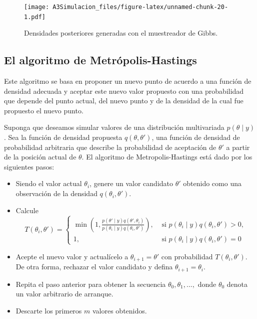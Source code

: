 \documentclass[
  10pt,
  spanish,
]{book}
\providecommand{\tightlist}{%
  \setlength{\itemsep}{0pt}\setlength{\parskip}{0pt}}
\theoremstyle{definition}
\theoremstyle{definition}
\theoremstyle{definition}
\theoremstyle{definition}
\theoremstyle{remark}
\begin{document}
\begin{figure}
\centering
\texttt{[image: A3Simulacion\_files/figure-latex/unnamed-chunk-20-1.pdf]}
\caption{\label{fig:unnamed-chunk-20}Densidades posteriores generadas con el muestreador de Gibbs.}
\end{figure}

\hypertarget{el-algoritmo-de-metruxf3polis-hastings}{%
\subsection{El algoritmo de Metrópolis-Hastings}\label{el-algoritmo-de-metruxf3polis-hastings}}

Este algoritmo se basa en proponer un nuevo punto de acuerdo a una función de densidad adecuada y aceptar este nuevo valor propuesto con una probabilidad que depende del punto actual, del nuevo punto y de la densidad de la cual fue propuesto el nuevo punto.

Suponga que deseamos simular valores de una distribución multivariada \(p(\theta \mid y)\). Sea la función de densidad propuesta \(q(\theta, \theta')\), una función de densidad de probabilidad arbitraria que
describe la probabilidad de aceptación de \(\theta'\) a partir de la posición actual de \(\theta\). El algoritmo de Metropolis-Hastings está dado por los siguientes pasos:

\begin{itemize}
\tightlist
\item
  Siendo el valor actual \(\theta_i\), genere un valor candidato \(\theta'\) obtenido como una observación de la densidad \(q(\theta_i, \theta')\).
\item
  Calcule
  \begin{equation*}
  T(\theta_i, \theta') =
  \begin{cases}
  \min \left(1,  \frac{p(\theta' \mid  y)q(\theta', \theta_i)}{p(\theta_i \mid  y)q(\theta_i, \theta')} \right),
  & \text{  si   } p(\theta_i \mid  y)q(\theta_i, \theta') > 0,\\ 
  1, & \text{  si   }
  p(\theta_i \mid y)q(\theta_i, \theta') = 0
  \end{cases}
  \end{equation*}
\item
  Acepte el nuevo valor y actualícelo a \(\theta_{i+1}=\theta'\) con probabilidad \(T(\theta_i, \theta')\). De otra forma, rechazar el valor candidato y defina \(\theta_{i+1}=\theta_i\).

  \item

  Repita el paso anterior para obtener la secuencia \(\theta_0,\theta_1,...,\)
  donde \(\theta_0\) denota un valor arbitrario de arranque.

  \item

  Descarte los primeros \(m\) valores obtenidos.
\end{itemize}
\end{document}
